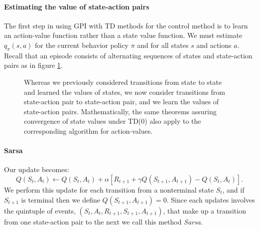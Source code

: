 \documentclass[12pt]{article}
\begin{document}
\paragraph{Estimating the value of state-action pairs}
The first step in using GPI with TD methods for the control method is to learn an action-value function rather than a state value function. We must estimate $q_\pi(s,a)$ for the current behavior policy $\pi$ and for all states $s$ and actions $a$. Recall that an episode consists of alternating sequences of states and state-action pairs as in figure \ref{fig: stateactionpairstransitions}. 

\begin{figure}[h]
  \centering
  \caption{\footnotesize Whereas we previously considered transitions from state to state and learned the values of states, we now consider transitions from state-action pair to state-action pair, and we learn the values of state-action pairs. Mathematically, the same theorems assuring convergence of state values under TD(0) also apply to the corresponding algorithm for action-values.}
\label{fig: stateactionpairstransitions}
\end{figure}

\paragraph{Sarsa}
Our update becomes:
\begin{equation}
  \label{eq: sarsa}
  Q(S_t, A_t) \gets Q(S_t, A_t) + \alpha \left[R_{t+1} + \gamma Q(S_{t+1}, A_{t+1}) - Q(S_t, A_t)\right].
\end{equation}
We perform this update for each transition from a nonterminal state $S_t$, and if $S_{t+1}$ is terminal then we define $Q(S_{t+1}, A_{t+1}) = 0$. Since each updates involves the quintuple of events, $(S_t, A_t, R_{t+1}, S_{t+1}, A_{t+1})$, that make up a transition from one state-action pair to the next we call this method \emph{Sarsa}.
\end{document}
